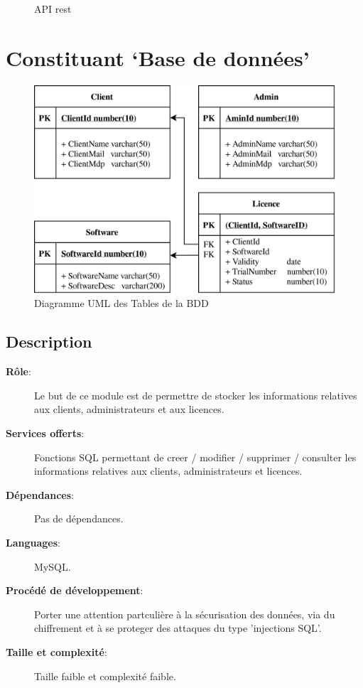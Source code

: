 \begin{figure}[hp!]
	\caption{API rest}
	
	\label{fig:fig2}
\end{figure}
\newpage

\section{Constituant `Base de données'}

\begin{figure}[h!]
	\centering
	\includegraphics[width=\textwidth - 2cm]{../png/SQL_table.png}
	\caption{Diagramme UML des Tables de la BDD}
	\label{fig:fig2}
\end{figure}

\subsection{Description}
\begin{description}
	\item[\textbf{Rôle}:]
		Le but de ce module est de permettre de stocker les informations relatives aux
		clients, administrateurs et aux licences. 
	\item[\textbf{Services offerts}:]
		Fonctions SQL permettant de creer / modifier / supprimer / consulter les 
	  informations relatives aux clients, administrateurs et licences.
	\item[\textbf{Dépendances}:]
		Pas de dépendances.		
	\item[\textbf{Languages}:]
		MySQL.
	\item[\textbf{Procédé de développement}:]
	  Porter une attention partculière à la sécurisation des données, via
	  du chiffrement et à se proteger des attaques du type 'injections SQL'. 
	\item[\textbf{Taille et complexité}:]
		Taille faible et complexité faible. 
\end{description}


